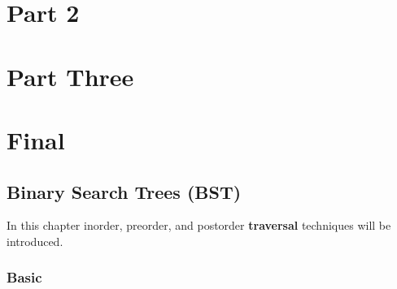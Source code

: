 \documentclass[11pt,fleqn]{book}
\begin{document}
\part{Part 2}





\part{Part Three}


\part{Final}

\chapter{Binary Search Trees (BST)}
In this chapter inorder, preorder, and postorder \textbf{traversal} techniques will be introduced. 
\section{Basic}
\end{document}
